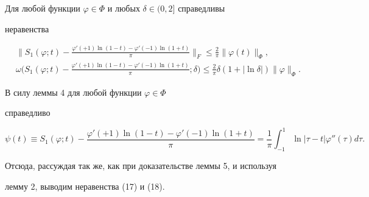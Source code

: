  


 


\begin{lem} 


Для любой функции $\varphi\in\Phi$ и любых $\delta\in(0,2]$ справедливы 


неравенства 


\begin{gather} 


\bigg\|S_1(\varphi;t)-\frac{\varphi'(+1)\ln(1-t)-\varphi'(-1) 


\ln(1+t)}{\pi}\bigg\|_F\le\frac{2}{\pi} 


\|\varphi(t)\|_\Phi, \\ 


% 


\omega\bigg(S_1(\varphi;t)-\frac{\varphi'(+1)\ln(1-t) 


-\varphi'(-1)\ln(1+t)}{\pi};\delta\bigg)\le\frac{2}{\pi} 


\delta(1+|\ln\delta|)\|\varphi\|_\Phi. 


\end{gather} 


\end{lem} 


 


\begin{pf} 


В силу леммы 4 для любой функции $\varphi\in\Phi$ 


справедливо 


$$ 


\psi(t)\equiv S_1(\varphi;t)- 


\frac{\varphi'(+1)\ln(1-t)-\varphi'(-1)\ln(1+t)}{\pi}= 


\frac{1}{\pi}\int^1_{-1}\ln|\tau-t|\varphi''(\tau)d\tau. 


$$ 


Отсюда, рассуждая так же, как при доказательстве леммы 5, и используя 


лемму 2, выводим неравенства (17) и (18). 


\end{pf} 


 


